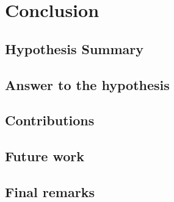 \chapter{Conclusion} \label{chap:conclusion} \minitoc

\section{Hypothesis Summary}
\section{Answer to the hypothesis}
\section{Contributions}
\section{Future work}
\section{Final remarks}